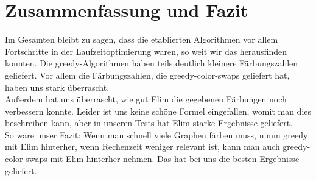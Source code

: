 \documentclass[11pt]{article}
\begin{document}
\section{Zusammenfassung und Fazit} %

Im Gesamten bleibt zu sagen, dass die etablierten Algorithmen vor allem Fortschritte in der Laufzeitoptimierung waren, so weit wir das herausfinden konnten. 
Die greedy-Algorithmen haben teils deutlich kleinere Färbungszahlen geliefert. Vor allem die Färbungszahlen, die greedy-color-swaps geliefert hat, haben uns stark überrascht. \\
Außerdem hat uns überrascht, wie gut Elim die gegebenen Färbungen noch verbessern konnte. Leider ist uns keine schöne Formel eingefallen, womit man dies beschreiben kann, aber in unseren Tests hat Elim starke Ergebnisse geliefert. \\
So wäre unser Fazit: Wenn man schnell viele Graphen färben muss, nimm greedy mit Elim hinterher, wenn Rechenzeit weniger relevant ist, kann man auch greedy-color-swaps mit Elim hinterher nehmen. Das hat bei uns die besten Ergebnisse geliefert.



\end{document}

